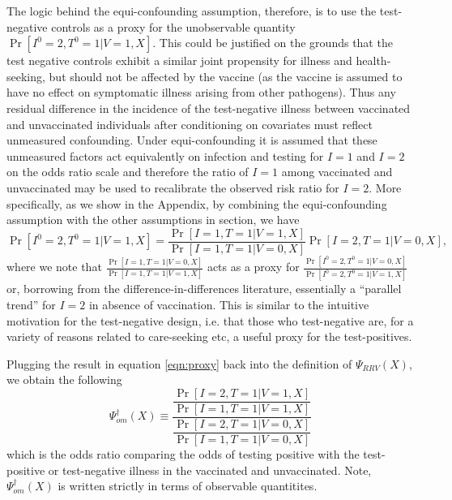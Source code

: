 \documentclass[11pt]{article}
\begin{document}
The logic behind the equi-confounding assumption, therefore, is to use the test-negative controls as a proxy for the unobservable quantity $\Pr[I^0 = 2, T^0 = 1 | V = 1, X]$. This could be justified on the grounds that the test negative controls exhibit a similar joint propensity for illness and health-seeking, but should not be affected by the vaccine (as the vaccine is assumed to have no effect on symptomatic illness arising from other pathogens). Thus any residual difference in the incidence of the test-negative illness between vaccinated and unvaccinated individuals after conditioning on covariates must reflect unmeasured confounding. Under equi-confounding it is assumed that these unmeasured factors act equivalently on infection and testing for $I=1$ and $I=2$ on the odds ratio scale and therefore the ratio of $I=1$ among vaccinated and unvaccinated may be used to recalibrate the observed risk ratio for $I = 2$. More specifically, as we show in the Appendix, by combining the equi-confounding assumption with the other assumptions in section, we have
    \begin{equation}\label{eqn:proxy}
     \Pr[I^0 = 2, T^0 = 1  | V = 1, X] = \frac{\Pr[I = 1, T = 1  | V = 1, X]}{\Pr[I = 1, T = 1  | V = 0, X]}\Pr[I = 2, T = 1 | V = 0, X],
    \end{equation}
where we note that $\frac{\Pr[I = 1, T =1  | V = 0, X]}{\Pr[I = 1, T = 1 | V = 1, X]}$ acts as a proxy for $\frac{\Pr[I^0 = 2, T^0 =1  | V = 0, X]}{\Pr[I^0 = 2, T^0 = 1 | V = 1, X]}$ or, borrowing from the difference-in-differences literature, essentially a ``parallel trend'' for $I=2$ in absence of vaccination. This is similar to the intuitive motivation for the test-negative design, i.e. that those who test-negative are, for a variety of reasons related to care-seeking etc, a useful proxy for the test-positives. 

Plugging the result in equation \ref{eqn:proxy} back into the definition of $\Psi_{RRV}(X)$, we obtain the following 
    \begin{equation}
         \Psi^\dagger_{om}(X) \equiv \dfrac{\dfrac{\Pr[I = 2, T = 1 | V = 1, X]}{\Pr[I = 1, T = 1 | V = 1, X]}}{\dfrac{\Pr[I = 2, T = 1 | V = 0, X]}{\Pr[I = 1, T = 1 | V = 0, X]}}
    \end{equation}
which is the odds ratio comparing the odds of testing positive with the test-positive or test-negative illness in the vaccinated and unvaccinated. Note, $\Psi^\dagger_{om}(X)$ is written strictly in terms of observable quantitites.
\end{document}
